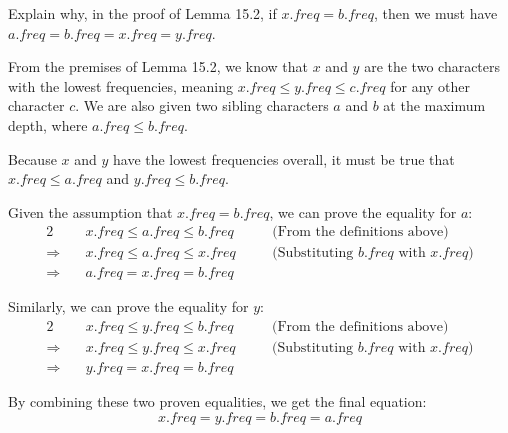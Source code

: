 \item[\textbf{Exercise 15.3-1}]
Explain why, in the proof of Lemma 15.2, if $\mathit{x.freq} = \mathit{b.freq}$,
then we must have $\mathit{a.freq} = \mathit{b.freq} = \mathit{x.freq} =
\mathit{y.freq}$. 

\Solution

From the premises of Lemma 15.2, we know that $x$ and $y$ are the two characters
with the lowest frequencies, meaning $x.freq \le y.freq \le c.freq$ for any
other character $c$. We are also given two sibling characters $a$ and $b$ at the
maximum depth, where $a.freq \le b.freq$. 

Because $x$ and $y$ have the lowest frequencies overall, it must be true that
$x.freq \le a.freq$ and $y.freq \le b.freq$. 

Given the assumption that $\mathit{x.freq} = \mathit{b.freq}$, we can prove the
equality for $a$:
\begin{alignat*}{2}
                      & \mathit{x.freq} \le \mathit{a.freq} \le \mathit{b.freq} \quad && \text{(From the definitions above)} \\
    \Rightarrow \quad & \mathit{x.freq} \le \mathit{a.freq} \le \mathit{x.freq} \quad && \text{(Substituting $\mathit{b.freq}$ with $\mathit{x.freq}$)} \\
    \Rightarrow \quad & \mathit{a.freq} = \mathit{x.freq} = \mathit{b.freq} &&
\end{alignat*}

Similarly, we can prove the equality for $y$:
\begin{alignat*}{2}
                      & \mathit{x.freq} \le \mathit{y.freq} \le \mathit{b.freq} \quad && \text{(From the definitions above)} \\
    \Rightarrow \quad & \mathit{x.freq} \le \mathit{y.freq} \le \mathit{x.freq} \quad && \text{(Substituting $\mathit{b.freq}$ with $\mathit{x.freq}$)} \\
    \Rightarrow \quad & \mathit{y.freq} = \mathit{x.freq} = \mathit{b.freq} &&
\end{alignat*}

By combining these two proven equalities, we get the final equation:
$$
    \mathit{x.freq} = \mathit{y.freq} = \mathit{b.freq} = \mathit{a.freq}
$$

